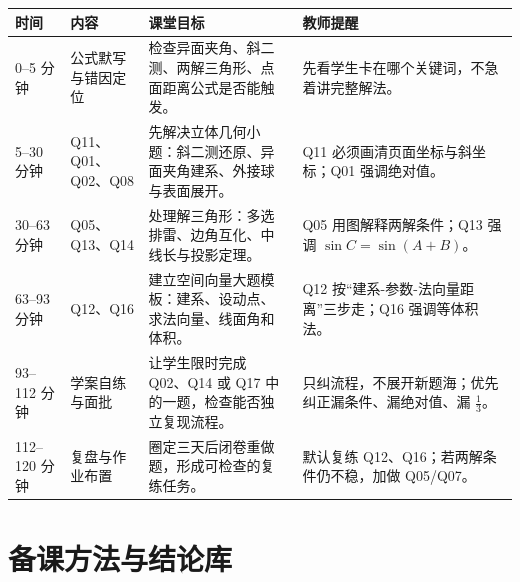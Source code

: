 \documentclass[11pt,a4paper]{ctexart}
\begin{document}
\begingroup
\small
\renewcommand{\arraystretch}{1.18}
\begin{tabularx}{\textwidth}{|p{2.1cm}|p{3.4cm}|X|p{3.6cm}|}
\hline
时间 & 内容 & 课堂目标 & 教师提醒\\ \hline
0--5 分钟 & 公式默写与错因定位 & 检查异面夹角、斜二测、两解三角形、点面距离公式是否能触发。 & 先看学生卡在哪个关键词，不急着讲完整解法。\\ \hline
5--30 分钟 & Q11、Q01、Q02、Q08 & 先解决立体几何小题：斜二测还原、异面夹角建系、外接球与表面展开。 & Q11 必须画清页面坐标与斜坐标；Q01 强调绝对值。\\ \hline
30--63 分钟 & Q05、Q13、Q14 & 处理解三角形：多选排雷、边角互化、中线长与投影定理。 & Q05 用图解释两解条件；Q13 强调 \(\sin C=\sin(A+B)\)。\\ \hline
63--93 分钟 & Q12、Q16 & 建立空间向量大题模板：建系、设动点、求法向量、线面角和体积。 & Q12 按“建系-参数-法向量距离”三步走；Q16 强调等体积法。\\ \hline
93--112 分钟 & 学案自练与面批 & 让学生限时完成 Q02、Q14 或 Q17 中的一题，检查能否独立复现流程。 & 只纠流程，不展开新题海；优先纠正漏条件、漏绝对值、漏 \(\frac13\)。\\ \hline
112--120 分钟 & 复盘与作业布置 & 圈定三天后闭卷重做题，形成可检查的复练任务。 & 默认复练 Q12、Q16；若两解条件仍不稳，加做 Q05/Q07。\\ \hline
\end{tabularx}
\endgroup

\newpage

\section{备课方法与结论库}
\end{document}
